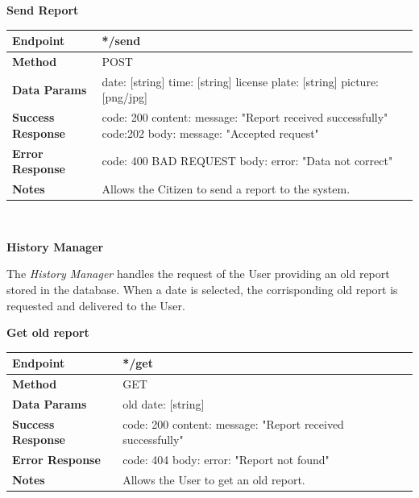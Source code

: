 \documentclass{report}
\begin{document}
\begin{center}{\textbf{Send Report}}\end{center}
    \begin{tabular}{| l | p{8cm} |}
        \hline
        \textbf{Endpoint} & */send \\
        \hline
        \textbf{Method} & POST \\
        \hline
        \textbf{Data Params} & date: [string] \newline time: [string] \newline license plate: [string] \newline picture: [png/jpg]\\
        \hline
        \textbf{Success Response} &  code: 200 \newline content: {message: "Report received successfully"} \newline \newline code:202 \newline body: {message: "Accepted request"}\\
        \hline
        \textbf{Error Response} & code: 400 BAD REQUEST \newline body: {error: "Data not correct"}\\
        \hline
        \textbf{Notes} & Allows the Citizen to send a report to the system. \\
        \hline
    \end{tabular}
\\
\begin{center}\large{\textbf{History Manager}}\end{center}
    The \textit{History Manager} handles the request of the User providing an old report stored in the database. When a date is selected, the corrisponding old report is requested and delivered to the User.
\begin{center}{\textbf{Get old report}}\end{center}
    \begin{tabular}{| l | p{8cm} |}
        \hline
        \textbf{Endpoint} & */get \\
        \hline
        \textbf{Method} & GET \\
        \hline
        \textbf{Data Params} & old date: [string]\\
        \hline
        \textbf{Success Response} &  code: 200 \newline content: {message: "Report received successfully"}\\
        \hline
        \textbf{Error Response} & code: 404 \newline body: {error: "Report not found"}\\
        \hline
        \textbf{Notes} & Allows the User to get an old report. \\
        \hline
    \end{tabular}
\end{document}
